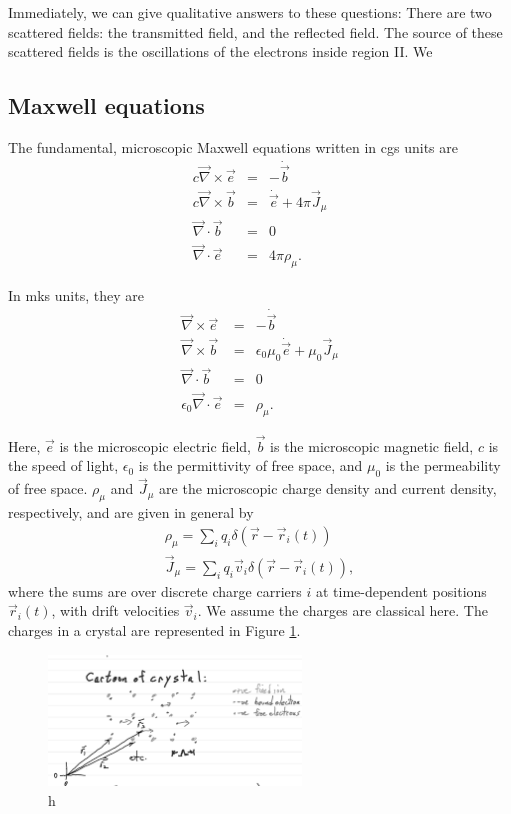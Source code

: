 \documentclass{article}
\begin{document}
Immediately, we can give qualitative answers to these questions: There are two scattered fields: the transmitted field, and the reflected field. The source of these scattered fields is the oscillations of the electrons inside region II. We 

\subsection{Maxwell equations}
The fundamental, microscopic Maxwell equations written in cgs units are 
\begin{eqnarray}
    c\vec\nabla\times\vec e &= &-\dot{\vec{b}} \\
    c\vec\nabla\times\vec b &= &\dot{\vec{e}} + 4\pi \vec{J}_\mu \\
    \vec\nabla\cdot\vec b &= &0 \\
    \vec\nabla\cdot\vec e &= &4\pi \rho_\mu.
\end{eqnarray}

In mks units, they are
\begin{eqnarray}
    \vec\nabla\times\vec e &= &-\dot{\vec{b}} \\
    \vec\nabla\times\vec b &= &\epsilon_0 \mu_0 \dot{\vec{e}} + \mu_0\vec{J}_\mu \\
    \vec\nabla\cdot\vec b &= &0 \\
    \epsilon_0 \vec\nabla\cdot\vec e &= &\rho_\mu.
\end{eqnarray}

Here, $\vec e$ is the microscopic electric field, $\vec b$ is the microscopic magnetic field, $c$ is the speed of light, $\epsilon_0$ is the permittivity of free space, and $\mu_0$ is the permeability of free space. $\rho_\mu$ and $\vec{J}_\mu$ are the microscopic charge density and current density, respectively, and are given in general by 
\begin{eqnarray}
    \rho_\mu = \sum_{i}^{} q_i \delta(\vec r - \vec r_i(t)) \\
    \vec{J}_\mu = \sum_{i}^{} q_i \vec{v}_i \delta(\vec r - \vec r_i(t)),
\end{eqnarray}
where the sums are over discrete charge carriers $i$ at time-dependent positions $\vec{r}_i(t)$, with drift velocities $\vec v_i$. We assume the charges are classical here. The charges in a crystal are represented in Figure \ref{fig:crystal_cartoon}.

\begin{figure}
    \label{fig:crystal_cartoon}
    \includegraphics[width=0.6\textwidth]{figures/crystal_cartoon.png}
    \centering
    \caption{h}
\end{figure}
\end{document}
